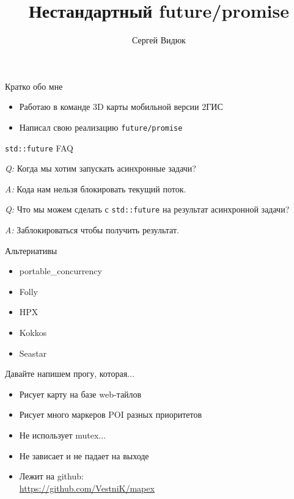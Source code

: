 \documentclass[aspectratio=169,hyperref={unicode},17pt]{beamer}
\title{Нестандартный future/promise}
\author{Сергей Видюк}
\date{}
\begin{document}
\begin{frame}
 \maketitle
\end{frame}

\begin{frame}[t]{Кратко обо мне}
 \begin{itemize}
  \item Работаю в команде 3D карты мобильной версии 2ГИС
  \item Написал свою реализацию \texttt{future/promise}
 \end{itemize}
\end{frame}

\begin{frame}[fragile,t]{\texttt{std::future} FAQ}

{\em Q:} Когда мы хотим запускать асинхронные задачи?

{\em A:} Кода нам нельзя блокировать текущий поток.

{\em Q:} Что мы можем сделать с \texttt{std::future} на результат асинхронной задачи?

{\em A:} Заблокироваться чтобы получить результат.
\end{frame}

\begin{frame}[fragile,t]{Альтернативы}
\begin{itemize}
  \item portable\_concurrency
  \item Folly
  \item HPX
  \item Kokkos
  \item Seastar
 \end{itemize}
\end{frame}

\begin{frame}[t]{Давайте напишем прогу, которая...}
 \begin{itemize}
  \item Рисует карту на базе web-тайлов
  \item Рисует много маркеров POI разных приоритетов
  \item Не использует mutex...
  \item Не зависает и не падает на выходе
  \item Лежит на github: \\ \footnotesize{\url{https://github.com/VestniK/mapex}}
 \end{itemize}
\end{frame}
\end{document}
